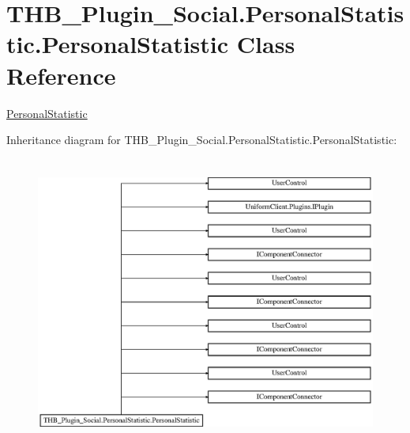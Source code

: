 \hypertarget{class_t_h_b___plugin___social_1_1_personal_statistic_1_1_personal_statistic}{}\section{T\+H\+B\+\_\+\+Plugin\+\_\+\+Social.\+Personal\+Statistic.\+Personal\+Statistic Class Reference}
\label{class_t_h_b___plugin___social_1_1_personal_statistic_1_1_personal_statistic}


\mbox{\hyperlink{class_t_h_b___plugin___social_1_1_personal_statistic_1_1_personal_statistic}{Personal\+Statistic}}  


Inheritance diagram for T\+H\+B\+\_\+\+Plugin\+\_\+\+Social.\+Personal\+Statistic.\+Personal\+Statistic\+:\begin{figure}[H]
\begin{center}
\leavevmode
\includegraphics[height=9.565217cm]{d7/d60/class_t_h_b___plugin___social_1_1_personal_statistic_1_1_personal_statistic}
\end{center}
\end{figure}
